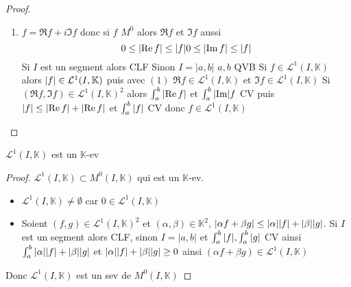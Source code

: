 \documentclass[11pt,hidelinks]{book}
\theoremstyle{mytheoremstyle}
\theoremstyle{mytheoremstyle}
\theoremstyle{mytheoremstyle}
\theoremstyle{mytheoremstyle}
\theoremstyle{mytheoremstyle}
\theoremstyle{mytheoremstyle}
\theoremstyle{mytheoremstyle}
\theoremstyle{mytheoremstyle}
\theoremstyle{myproblemstyle}
\def\mbb#1{\mathbb{#1}}
\def\mfc#1{\mathcal{#1}}
\def\L{\mfc{L}^1(I,\bK)}
\def\bK{\mbb{K}}
\begin{document}
\begin{adjustwidth}{-2em}{-1em}
\begin{prop}
\begin{proof}
\begin{enumerate}
            \item $f = \Re f + i\Im f$ donc si $f$ $M^0$ alors $\Re f$ et $\Im f$ aussi 
            \begin{equation}
                0 \leq \abs{\Re f} \leq \abs{f} \\
                0 \leq \abs{\Im f} \leq \abs{f}
            \end{equation}
            Si $I$ est un segment alors CLF
            Sinon $I = |a,b|$ $a,b$ QVB\newline 
            Si $f \in \L$ alors $\abs{f} \in \L$ puis avec $(1)$ $\Re f \in \L$ et $\Im f \in \L$ \newline 
            Si $(\Re f, \Im f) \in \L^2$ alors $\int_{a}^{b} \abs{\Re f}$ et $\int_{a}^{b} \abs{\Im} f$ CV
            puis $\abs{f} \leq \abs{\Re f} + \abs{\Re f}$ et $\int_{a}^{b} \abs{f}$ CV donc $f \in \L$
        \end{enumerate}
        \end{proof}
    \end{prop}
        \begin{theorem}
            $\L$ est un $\bK$-ev
            \begin{proof}
                $\L \subset M^0(I, \bK)$ qui est un $\bK$-ev.
                \begin{itemize}[label=$\circ$]
                    \item $\L \not= \emptyset$ car $0 \in \L$ 
                    \item Soient $(f,g) \in \L^2$ et $(\alpha, \beta) \in \bK^2$,
                    $\abs{\alpha f + \beta g} \leq \abs{\alpha} \abs{f} + \abs{\beta} \abs{g}$.
                    Si $I$ est un segment alors CLF, sinon $I = |a,b|$ et $\int_{a}^{b} \abs{f}, \int_{a}^{b} \abs{g}$ CV 
                    ainsi $\int_{a}^{b}\abs{\alpha} \abs{f} + \abs{\beta} \abs{g}$ et $\abs{\alpha} \abs{f} + \abs{\beta} \abs{g} \geq 0$ 
                    ainsi $(\alpha f + \beta g) \in \L$
                \end{itemize}
                Donc $\L$ est un sev de $M^0(I, \bK)$
            \end{proof}
        \end{theorem}
    \end{adjustwidth}
\end{document}
